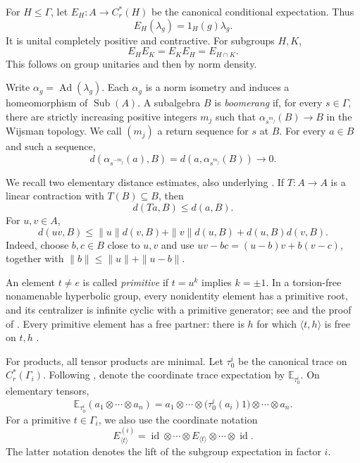 \documentclass[11pt,letterpaper]{amsart}
\numberwithin{equation}{section}
\theoremstyle{definition}
\theoremstyle{remark}
\newcommand{\Cr}{C_r^*}
\newcommand{\Sub}{\operatorname{Sub}}
\newcommand{\Ad}{\operatorname{Ad}}
\newcommand{\id}{\operatorname{id}}
\newcommand{\Ecyc}[2]{E_{\langle #2\rangle}^{(#1)}}
\newcommand{\Etrace}[1]{\mathbb E_{\tau_0^{#1}}}
\begin{document}
For $H\le\Gamma$, let $E_H:A\to\Cr(H)$ be the canonical conditional
expectation. Thus
\[
 E_H(\lambda_g)=1_H(g)\lambda_g.
\]
It is unital completely positive and contractive. For subgroups $H,K$,
\begin{equation}\label{eq:expectation-intersection}
 E_HE_K=E_KE_H=E_{H\cap K}.
\end{equation}
This follows on group unitaries and then by norm density.

Write $\alpha_g=\Ad(\lambda_g)$. Each $\alpha_g$ is a norm isometry and
induces a homeomorphism of $\Sub(A)$.
A subalgebra $B$ is \emph{boomerang} if, for every $s\in\Gamma$, there
are strictly increasing positive integers $m_j$ such that
$\alpha_{s^{m_j}}(B)\to B$ in the Wijsman topology.
We call $(m_j)$ a return sequence for $s$ at $B$.
For every $a\in B$ and such a sequence,
\begin{equation}\label{eq:return}
 d(\alpha_{s^{-m_j}}(a),B)
 =d(a,\alpha_{s^{m_j}}(B))\longrightarrow0.
\end{equation}

We recall two elementary distance estimates, also underlying
\cite[Lemma~6.7]{FOT}. If $T:A\to A$ is a linear contraction with
$T(B)\subseteq B$, then
\begin{equation}\label{eq:contraction}
 d(Ta,B)\le d(a,B).
\end{equation}
For $u,v\in A$,
\begin{equation}\label{eq:product-distance}
 d(uv,B)\le \|u\|d(v,B)+\|v\|d(u,B)+d(u,B)d(v,B).
\end{equation}
Indeed, choose $b,c\in B$ close to $u,v$ and use
$uv-bc=(u-b)v+b(v-c)$, together with
$\|b\|\le\|u\|+\|u-b\|$.

An element $t\ne e$ is called \emph{primitive} if $t=u^k$ implies
$k=\pm1$. In a torsion-free nonamenable hyperbolic group, every nonidentity
element has a primitive root, and its centralizer is infinite cyclic
with a primitive generator; see \cite[Remark~4.2]{AJ} and the proof
of \cite[Lemma~6.5]{FOT}. Every primitive element has a free partner:
there is $h$ for which $\langle t,h\rangle$ is free on $t,h$
\cite[Theorem~0.2]{AD}.

For products, all tensor products are minimal. Let $\tau_0^i$ be the
canonical trace on $\Cr(\Gamma_i)$. Following
\cite[Section~5.2]{AJ}, denote the coordinate trace expectation by
$\Etrace{i}$. On elementary tensors,
\[
 \Etrace{i}(a_1\otimes\cdots\otimes a_n)
 =a_1\otimes\cdots\otimes
       \bigl(\tau_0^i(a_i)1\bigr)\otimes\cdots\otimes a_n.
\]
For a primitive $t\in\Gamma_i$, we also use the coordinate notation
\[
 \Ecyc{i}{t}
 =\id\otimes\cdots\otimes E_{\langle t\rangle}
                       \otimes\cdots\otimes\id.
\]
The latter notation denotes the lift of the subgroup expectation in
factor $i$.
\end{document}
